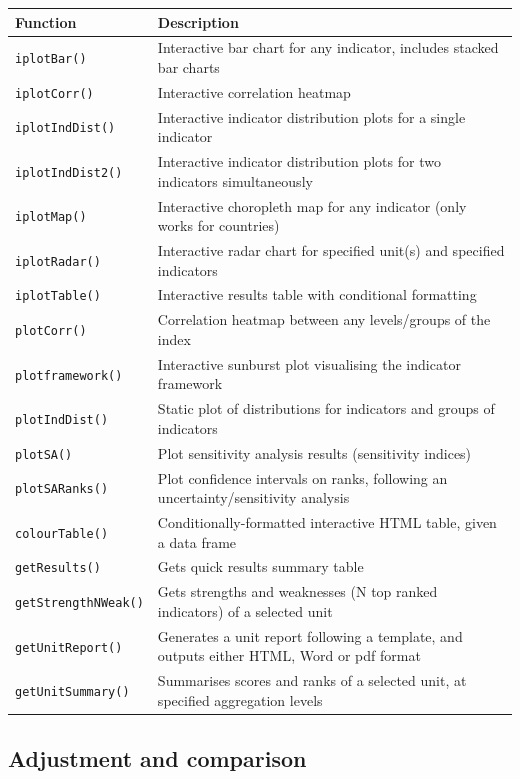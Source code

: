 \documentclass[
]{book}
\begin{document}
\begin{longtable}[]{@{}ll@{}}
\toprule
Function & Description \\
\midrule
\endhead
\texttt{iplotBar()} & Interactive bar chart for any indicator, includes stacked bar charts \\
\texttt{iplotCorr()} & Interactive correlation heatmap \\
\texttt{iplotIndDist()} & Interactive indicator distribution plots for a single indicator \\
\texttt{iplotIndDist2()} & Interactive indicator distribution plots for two indicators simultaneously \\
\texttt{iplotMap()} & Interactive choropleth map for any indicator (only works for countries) \\
\texttt{iplotRadar()} & Interactive radar chart for specified unit(s) and specified indicators \\
\texttt{iplotTable()} & Interactive results table with conditional formatting \\
\texttt{plotCorr()} & Correlation heatmap between any levels/groups of the index \\
\texttt{plotframework()} & Interactive sunburst plot visualising the indicator framework \\
\texttt{plotIndDist()} & Static plot of distributions for indicators and groups of indicators \\
\texttt{plotSA()} & Plot sensitivity analysis results (sensitivity indices) \\
\texttt{plotSARanks()} & Plot confidence intervals on ranks, following an uncertainty/sensitivity analysis \\
\texttt{colourTable()} & Conditionally-formatted interactive HTML table, given a data frame \\
\texttt{getResults()} & Gets quick results summary table \\
\texttt{getStrengthNWeak()} & Gets strengths and weaknesses (N top ranked indicators) of a selected unit \\
\texttt{getUnitReport()} & Generates a unit report following a template, and outputs either HTML, Word or pdf format \\
\texttt{getUnitSummary()} & Summarises scores and ranks of a selected unit, at specified aggregation levels \\
\bottomrule
\end{longtable}

\hypertarget{adjustment-and-comparison}{%
\subsection{Adjustment and comparison}\label{adjustment-and-comparison}}
\end{document}
